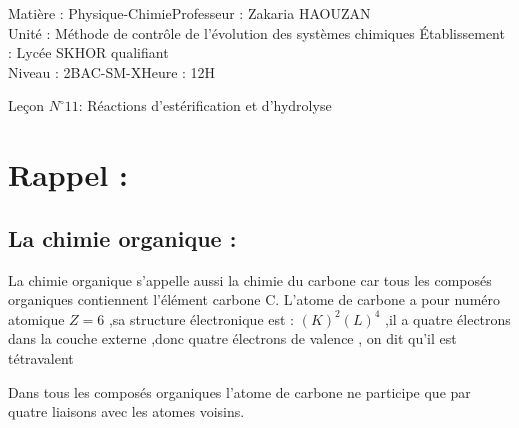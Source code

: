 \documentclass[12pt]{article}
\author{Zakaria HAOUZAN}
\date{\today}
\newcommand\headerMe[2]{\noindent{}#1\hfill#2}
\begin{document}
\headerMe{Matière : Physique-Chimie}{Professeur : Zakaria HAOUZAN}\\
\headerMe{Unité : Méthode de
contrôle de
l’évolution des
systèmes
chimiques }{Établissement : Lycée SKHOR qualifiant}\\
\headerMe{Niveau : 2BAC-SM-X}{Heure : 12H}\\

\begin{center}

  \Large{Leçon $N^{\circ} 11 $: \color{red} Réactions d'estérification et d'hydrolyse }
\end{center}








\section{Rappel : }
\subsection{La chimie organique :}
La chimie organique s'appelle aussi la chimie du carbone car tous les composés organiques contiennent l'élément carbone C.
L'atome de carbone a pour numéro atomique $Z=6$ ,sa structure électronique est : $(K)^2(L)^4$
,il a quatre électrons dans la couche externe ,donc quatre électrons de valence , on dit qu'il est tétravalent

Dans tous les composés organiques l'atome de carbone ne participe que par quatre liaisons avec les atomes voisins.
\end{document}
